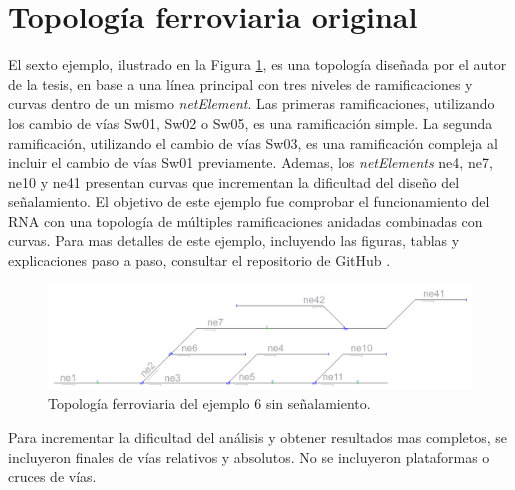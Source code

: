 \section{Topología ferroviaria original}

	El sexto ejemplo, ilustrado en la Figura \ref{fig:EJ6_1}, es una topología diseñada por el autor de la tesis, en base a una línea principal con tres niveles de ramificaciones y curvas dentro de un mismo \textit{netElement}. Las primeras ramificaciones, utilizando los cambio de vías Sw01, Sw02 o Sw05, es una ramificación simple. La segunda ramificación, utilizando el cambio de vías Sw03, es una ramificación compleja al incluir el cambio de vías Sw01 previamente. Ademas, los \textit{netElements} ne4, ne7, ne10 y ne41 presentan curvas que incrementan la dificultad del diseño del señalamiento. El objetivo de este ejemplo fue comprobar el funcionamiento del RNA con una topología de múltiples ramificaciones anidadas combinadas con curvas. Para mas detalles de este ejemplo, incluyendo las figuras, tablas y explicaciones paso a paso, consultar el repositorio de GitHub \cite{GITHUB_PHD}.
	
	\begin{figure}[h]
		\centering
		\includegraphics[width=1\textwidth]{resultados-obtenidos/ejemplo6/images/6_empty.png}
		\centering\caption{Topología ferroviaria del ejemplo 6 sin señalamiento.}
		\label{fig:EJ6_1}
	\end{figure}
	
	Para incrementar la dificultad del análisis y obtener resultados mas completos, se incluyeron finales de vías relativos y absolutos. No se incluyeron plataformas o cruces de vías.
